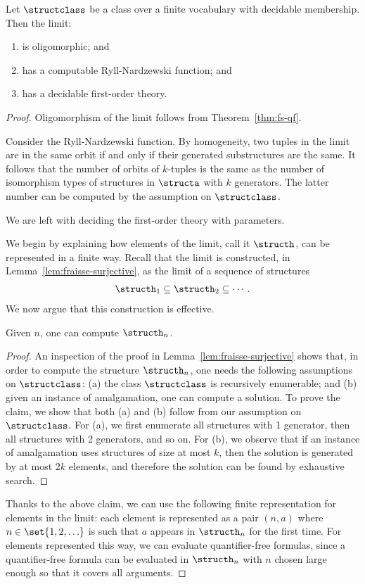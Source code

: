 \begin{theorem}\label{thm:computable-fraisse}
	Let $\structclass$ be a \fraisse class over a finite vocabulary with decidable membership. Then the \fraisse limit:
	\begin{enumerate}
\item is oligomorphic; and
\item has a computable Ryll-Nardzewski function; and
\item has a decidable first-order theory.
		\end{enumerate}
\end{theorem}
\begin{proof}
	Oligomorphism of the \fraisse limit follows from Theorem~\ref{thm:fs-qf}. 
	
	 Consider the Ryll-Nardzewski function. By homogeneity, two tuples in the \fraisse limit are in the same orbit if and only if their generated substructures are the same. It follows that the number of orbits of $k$-tuples is the same as the number of isomorphism types of structures in $\structa$ with $k$ generators. The latter number can be computed by the assumption on $\structclass$. 
	
	We are left with deciding the first-order theory with parameters. 
	
	We begin by explaining how elements of the \fraisse limit, call it $\structh$, can be represented in a finite way. Recall that the \fraisse limit is constructed, in Lemma~\ref{lem:fraisse-surjective}, as the limit of a sequence of structures
	\begin{align*}
		\structh_1 \subseteq \structh_2 \subseteq \cdots.
	\end{align*}
We now argue that this construction is effective. 
	\begin{claim}
		Given $n$, one can compute $\structh_n$.
	\end{claim}
	\begin{proof}
		An inspection of the proof in Lemma~\ref{lem:fraisse-surjective} shows that, in order to compute the structure $\structh_n$, one needs the following assumptions on $\structclass$: (a) the class $\structclass$ is recursively enumerable; and (b) given an instance of amalgamation, one can compute a solution. To prove the claim, we show that both (a) and (b) follow from our assumption on $\structclass$. For (a), we first enumerate all structures with 1 generator, then all structures with 2 generators, and so on. For (b), we observe that if an instance of amalgamation uses structures of size at most $k$, then the solution is generated by at most $2k$ elements, and therefore the solution can be found by exhaustive search.
	\end{proof}
 Thanks to the above claim, we can use the following finite representation for elements in the \fraisse limit: each element is represented as a pair $(n,a)$ where $n \in \set{1,2,\ldots}$ is such that $a$ appears in $\structh_n$ for the first time. For elements represented this way, we can evaluate quantifier-free formulas, since a quantifier-free formula can be evaluated in $\structh_n$ with $n$ chosen large enough so that it covers all arguments. 


\end{proof}
